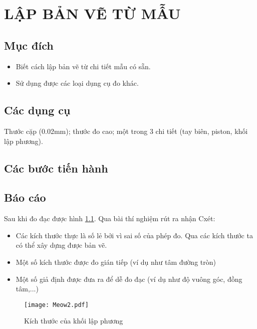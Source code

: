 \chapter{LẬP BẢN VẼ TỪ MẪU}

\section{Mục đích}
\begin{itemize}
	\item Biết cách lập bản vẽ từ chi tiết mẫu có sẵn.
	\item Sử dụng được các loại dụng cụ đo khác.
\end{itemize}

\section{Các dụng cụ}
Thước cặp (0.02mm); thước đo cao; một trong 3 chi tiết (tay biên, piston, khối lập phương).

\section{Các bước tiến hành}

\section{Báo cáo}

Sau khi đo đạc được hình \ref{t}. Qua bài thí nghiệm rút ra nhận Cxét:

\begin{itemize}
	\item Các kích thước thực là số lẻ bởi vì sai số của phép đo. Qua các kích thước ta có thể xây dựng được bản vẽ.
	\item Một số kích thước được đo gián tiếp (ví dụ như tâm đường tròn)
	\item Một số giả định được đưa ra để dễ đo đạc (ví dụ như độ vuông góc, đồng tâm,...)
\end{itemize}

\begin{figure}[ht]
	\centering
	\texttt{[image: Meow2.pdf]}
	\caption{Kích thước của khối lập phương}
	\label{t}
\end{figure}

